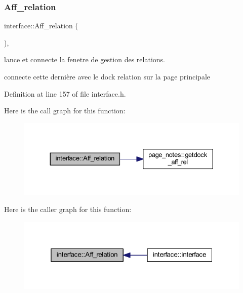 \subsubsection{\texorpdfstring{Aff\+\_\+relation}{Aff\_relation}}
{\footnotesize\ttfamily interface\+::\+Aff\+\_\+relation (\begin{DoxyParamCaption}{ }\end{DoxyParamCaption})\hspace{0.3cm}{\ttfamily [inline]}, {\ttfamily [slot]}}



lance et connecte la fenetre de gestion des relations. 

connecte cette dernière avec le dock relation sur la page principale 

Definition at line 157 of file interface.\+h.

Here is the call graph for this function\+:\nopagebreak
\begin{figure}[H]
\begin{center}
\leavevmode
\includegraphics[width=330pt]{classinterface_a287c8a46ece12a94540a190b96b911c9_cgraph}
\end{center}
\end{figure}
Here is the caller graph for this function\+:\nopagebreak
\begin{figure}[H]
\begin{center}
\leavevmode
\includegraphics[width=319pt]{classinterface_a287c8a46ece12a94540a190b96b911c9_icgraph}
\end{center}
\end{figure}
\mbox{\label{classinterface_a320051a7a36aa24f53b12df82649f15f}} 
